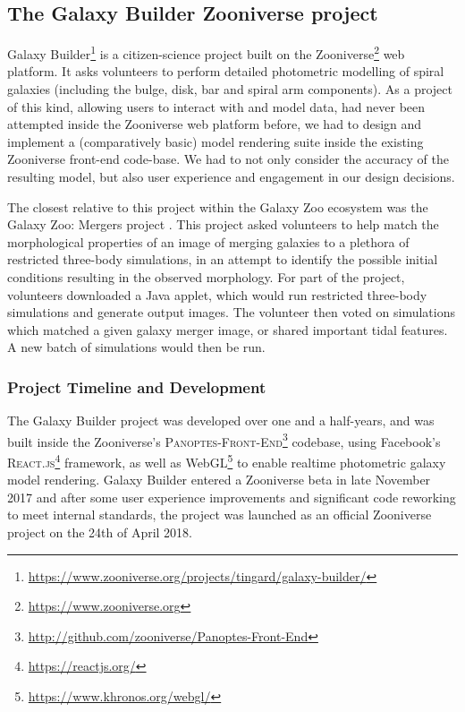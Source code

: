 \documentclass[../main.tex]{subfiles}
\begin{document}
\label{sec:method}

\subsection{The Galaxy Builder Zooniverse project}

Galaxy Builder\footnote{\url{https://www.zooniverse.org/projects/tingard/galaxy-builder/}} is a citizen-science project built on the Zooniverse\footnote{\url{https://www.zooniverse.org}} web platform. It asks volunteers to perform detailed photometric modelling of spiral galaxies (including the bulge, disk, bar and spiral arm components). As a project of this kind, allowing users to interact with and model data, had never been attempted inside the Zooniverse web platform before, we had to design and implement a (comparatively basic) model rendering suite inside the existing Zooniverse front-end code-base. We had to not only consider the accuracy of the resulting model, but also user experience and engagement in our design decisions.

The closest relative to this project within the Galaxy Zoo ecosystem was the Galaxy Zoo: Mergers project \citep{Holincheck2016:1604.00435v1}. This project asked volunteers to help match the morphological properties of an image of merging galaxies to a plethora of restricted three-body simulations, in an attempt to identify the possible initial conditions resulting in the observed morphology. For part of the project, volunteers downloaded a Java applet, which would run restricted three-body simulations and generate output images. The volunteer then voted on simulations which matched a given galaxy merger image, or shared important tidal features. A new batch of simulations would then be run.

\subsubsection{Project Timeline and Development}

The Galaxy Builder project was developed over one and a half-years, and was built inside the Zooniverse's \textsc{Panoptes-Front-End}\footnote{\url{http://github.com/zooniverse/Panoptes-Front-End}} codebase, using Facebook's \textsc{React.js}\footnote{\url{https://reactjs.org/}} framework, as well as WebGL\footnote{\url{https://www.khronos.org/webgl/}} to enable realtime photometric galaxy model rendering. Galaxy Builder entered a Zooniverse beta in late November 2017 and after some user experience improvements and significant code reworking to meet internal standards, the project was launched as an official Zooniverse project on the 24th of April 2018.
\end{document}
